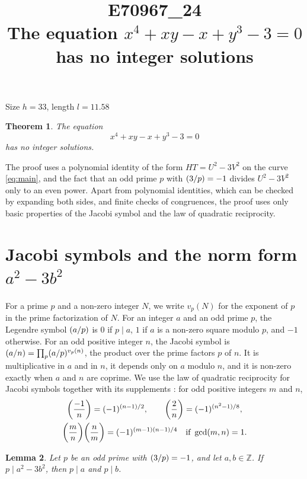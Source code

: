 \documentclass[11pt]{article}
\title{\textbf{E70967\_24}\\[4pt] {\Large The equation $x^{4}+xy-x+y^{3}-3=0$ has no integer solutions}}
\author{}
\date{}
\newtheorem{theorem}{Theorem}
\newtheorem{lemma}[theorem]{Lemma}
\newcommand{\Z}{\mathbb{Z}}
\newcommand{\leg}[2]{\mathchoice{\biggl(\dfrac{#1}{#2}\biggr)}{(#1/#2)}{(#1/#2)}{(#1/#2)}}
\begin{document}
\maketitle
\vspace{-8ex}
\begin{center}
Size $h=33$, length $l=11.58$
\end{center}

\begin{theorem}\label{thm:main}
The equation
\begin{equation}\label{eq:main}
x^{4}+xy-x+y^{3}-3=0
\end{equation}
has no integer solutions.
\end{theorem}

The proof uses a polynomial identity of the form $HT=U^2-3V^2$ on the curve \eqref{eq:main}, and the fact that an odd prime $p$ with $\leg{3}{p}=-1$ divides $U^2-3V^2$ only to an even power. Apart from polynomial identities, which can be checked by expanding both sides, and finite checks of congruences, the proof uses only basic properties of the Jacobi symbol and the law of quadratic reciprocity.

\section{\texorpdfstring{Jacobi symbols and the norm form $a^2-3b^2$}{Jacobi symbols and the norm form}}

For a prime $p$ and a non-zero integer $N$, we write $v_p(N)$ for the exponent of $p$ in the prime factorization of $N$. For an integer $a$ and an odd prime $p$, the Legendre symbol $\leg{a}{p}$ is $0$ if $p\mid a$, $1$ if $a$ is a non-zero square modulo $p$, and $-1$ otherwise. For an odd positive integer $n$, the Jacobi symbol is $\leg{a}{n}=\prod_p\leg{a}{p}^{v_p(n)}$, the product over the prime factors $p$ of $n$. It is multiplicative in $a$ and in $n$, it depends only on $a$ modulo $n$, and it is non-zero exactly when $a$ and $n$ are coprime. We use the law of quadratic reciprocity for Jacobi symbols together with its supplements \cite[Chapter~5, \S2]{IR}: for odd positive integers $m$ and $n$,
\begin{gather*}
\leg{-1}{n}=(-1)^{(n-1)/2},\qquad\leg{2}{n}=(-1)^{(n^2-1)/8},\\
\leg{m}{n}\leg{n}{m}=(-1)^{(m-1)(n-1)/4}\quad\text{if }\gcd(m,n)=1.
\end{gather*}

\begin{lemma}\label{lem:divides}
Let $p$ be an odd prime with $\leg{3}{p}=-1$, and let $a,b\in\Z$. If $p\mid a^2-3b^2$, then $p\mid a$ and $p\mid b$.
\end{lemma}
\end{document}

